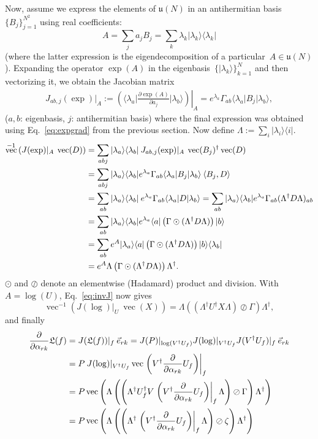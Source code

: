 \documentclass[aps,pra,12pt,showpacs,showkeys,nofootinbib,superscriptaddress,longbibliography]{revtex4}
\newcommand{\bra}[1]{\mbox{$\langle #1|$}}
\newcommand{\ket}[1]{\mbox{$|#1\rangle$}}
\newcommand{\ketbra}[2]{\mbox{$|#1\rangle\langle #2|$}}
\newcommand{\inprod}[2]{\mbox{$\langle #1, #2\rangle$}}
\DeclareMathOperator{\VEC}{vec}
\newcommand{\mf}[1]{\mathfrak{#1}}
\newcommand{\pde}[2]{\frac{\partial #1}{\partial #2}}
\newcommand{\be}{\begin{equation}}
\newcommand{\ee}{\end{equation}}
\begin{document}
Now, assume we express the elements of
$\mf{u}(N)$
in an antihermitian basis~$\{B_j\}_{j=1}^{N^2}$ using real coefficients:
\be
A = \sum_j a_j B_j = \sum_k \lambda_k \ketbra{\lambda_k}{\lambda_k}
\ee
(where the latter expression is the eigendecomposition of a
particular~$A \in \mf{u}(N)$).
Expanding the operator $\exp(A)$ in the eigenbasis~$\{\ket{\lambda_k}\}_{k=1}^N$ and then vectorizing it, we
obtain the Jacobian matrix
\begin{align}
J_{ab,j}(\exp)|_A
:= \left.\left(\bra{\lambda_a}  \pde{\exp(A)}{a_j} \ket{\lambda_b} \right) \right|_A
= e^{\lambda_a} \Gamma_{ab} \bra{\lambda_a} B_j \ket{\lambda_b},
\end{align}
($a,b$: eigenbasis, $j$: antihermitian basis)
where the final expression was obtained using Eq.~\eqref{eq:expgrad} from the previous section.
Now define $\Lambda := \sum_i \ketbra{\lambda_i}{i}$.
\begin{align}
\notag
\VEC^{-1}\left(J(\exp)|_A \: \VEC(D)\right)
&= \sum_{abj} \ketbra{\lambda_a}{\lambda_b} \: J_{ab,j}(\exp)|_A \: \VEC(B_j)^\dagger \VEC(D)\\
\notag
&= \sum_{abj} \ketbra{\lambda_a}{\lambda_b}
e^{\lambda_a} \Gamma_{ab} \bra{\lambda_a} B_j \ket{\lambda_b} \: \inprod{B_j}{D}\\
\notag
&= \sum_{ab} \ketbra{\lambda_a}{\lambda_b} \: e^{\lambda_a} \Gamma_{ab} \bra{\lambda_a}
D \ket{\lambda_b}
= \sum_{ab} \ketbra{\lambda_a}{\lambda_b} e^{\lambda_a} \Gamma_{ab} (\Lambda^\dagger
D \Lambda)_{ab}\\
&= \sum_{ab} \ketbra{\lambda_a}{\lambda_b} e^{\lambda_a} \bra{a} \left(\Gamma \odot
(\Lambda^\dagger D \Lambda) \right) \ket{b}\\
&= \sum_{ab} e^A \ketbra{\lambda_a}{a} \left(\Gamma \odot
(\Lambda^\dagger D \Lambda) \right) \ketbra{b}{\lambda_b}\\
&= e^A \Lambda \left(\Gamma \odot
(\Lambda^\dagger D \Lambda) \right) \Lambda^\dagger.
\end{align}
$\odot$ and $\oslash$ denote an elementwise (Hadamard) product and division.
With $A = \log(U)$, Eq.~\eqref{eq:invJ} now gives
\be
\VEC^{-1} \left( J(\log)|_U \: \VEC(X) \right)
= 
\Lambda \left((\Lambda^\dagger U^\dagger X \Lambda)
\oslash \Gamma\right) \Lambda^\dagger,
\ee
and finally
\begin{align}
\notag
\pde{}{\alpha_{rk}} \mf{L}(f)
&= J(\mf{L}(f))|_f \: \vec{e}_{rk}
= J(P)|_{\log(V^\dagger U_f)} J(\log)|_{V^\dagger U_f} J(V^\dagger U_f)|_{f} \: \vec{e}_{rk}\\
\notag
&= P \: J(\log)|_{V^\dagger U_f}
\VEC \left. \left( V^\dagger \pde{}{\alpha_{rk}} U_f \right)\right|_{f}\\
\notag
&= P \VEC \left( 
\Lambda \left( \left(\Lambda^\dagger U_f^\dagger V
\left. \left( V^\dagger \pde{}{\alpha_{rk}} U_f \right)\right|_{f}
\Lambda \right) \oslash \Gamma \right) \Lambda^\dagger
\right)\\
&= P \VEC \left( 
\Lambda \left( \left(\Lambda^\dagger
\left. \left( V^\dagger \pde{}{\alpha_{rk}} U_f \right)\right|_{f}
\Lambda \right) \oslash \zeta \right) \Lambda^\dagger
\right)
\label{eq:gradientL}
\end{align}
\end{document}
